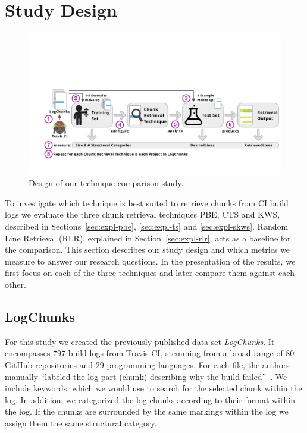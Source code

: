 \section{Study Design}
\label{sec:study}

\begin{figure}[tb]
	\centering
	\includegraphics[width=\textwidth, trim={1.6cm 1.6cm 0.2cm 5.6cm},
  clip]{img/study.pdf}
	\caption{Design of our technique comparison study.}
	\label{fig:study}
\end{figure}

To investigate which technique is best suited to retrieve chunks from
CI build logs we evaluate the three chunk retrieval techniques
PBE, CTS and KWS, described in Sections~\ref{sec:expl-pbe},
\ref{sec:expl-ts} and \ref{sec:expl-skws}.
Random Line Retrieval
(RLR), explained in Section~\ref{sec:expl-rlr}, acts as a baseline for
the comparison.
This section
describes our study design and which metrics we measure to answer our
research questions.
In the presentation of the results, we first focus
on each of the three techniques and later compare them against each
other.

\subsection{LogChunks}
For this study we created the previously published data set
\emph{LogChunks}.
It encompasses 797 build logs from Travis CI,
stemming from a broad range of 80 GitHub repositories and 29
programming languages.
For each file, the authors manually ``labeled
the log part (chunk) describing why the build
failed''~\cite{brandt2020logchunks}.
We include keywords, which we
would use to search for the selected chunk within the log.
In
addition, we categorized the log chunks according to their format
within the log.
If the chunks are surrounded by the same markings
within the log we assign them the same structural category.

